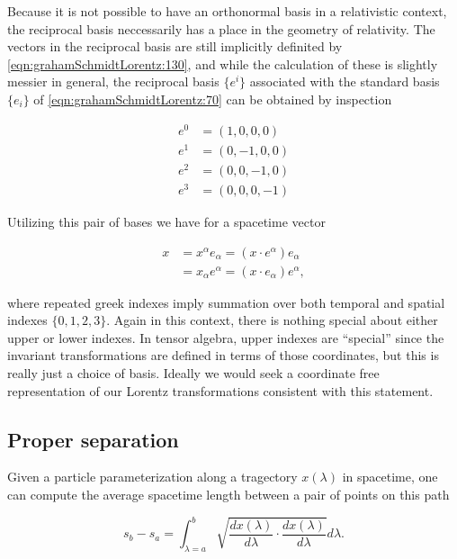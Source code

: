 Because it is not possible to have an orthonormal basis in a relativistic context, the reciprocal basis neccessarily has a place in the geometry of relativity.  The vectors in the reciprocal basis are still implicitly definited by \ref{eqn:grahamSchmidtLorentz:130}, and while the calculation of these is slightly messier in general, the reciprocal basis $\{e^i\}$ associated with the standard basis $\{e_i\}$ of \ref{eqn:grahamSchmidtLorentz:70} can be obtained by inspection

\begin{equation}\label{eqn:grahamSchmidtLorentz:70b}
\begin{aligned}
e^0 &= (1, 0, 0, 0) \\
e^1 &= (0, -1, 0, 0) \\
e^2 &= (0, 0, -1, 0) \\
e^3 &= (0, 0, 0, -1) 
\end{aligned}
\end{equation}

Utilizing this pair of bases we have for a spacetime vector

\begin{equation}\label{eqn:grahamSchmidtLorentz:331}
\begin{aligned}
x &= x^\alpha e_\alpha = (x \cdot e^\alpha) e_\alpha \\
  &= x_\alpha e^\alpha = (x \cdot e_\alpha) e^\alpha,
\end{aligned}
\end{equation}

where repeated greek indexes imply summation over both temporal and spatial indexes $\{0, 1, 2, 3\}$.  Again in this context, there is nothing special about either upper or lower indexes.  In tensor algebra, upper indexes are ``special'' since the invariant transformations are defined in terms of those coordinates, but this is really just a choice of basis.  Ideally we would seek a coordinate free representation of our Lorentz transformations consistent with this statement.

\subsection{Proper separation}

Given a particle parameterization along a tragectory $x(\lambda)$ in spacetime, one can compute the average spacetime length between a pair of points on this path

\begin{equation}\label{eqn:grahamSchmidtLorentz:400}
s_b - s_a = \int_{\lambda = a}^b \sqrt{ \frac{d x(\lambda)}{d\lambda} \cdot \frac{d x(\lambda)}{d\lambda} } d\lambda.
\end{equation}

